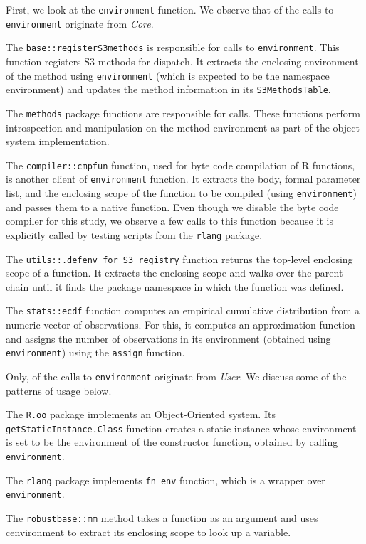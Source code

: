 \documentclass[10pt,review,sigplan,authorversion=true]{acmart}
\renewcommand{\c}[1]{\lstinline |#1|\xspace}
\begin{document}
First, we look at the \c{environment} function. We observe that
\EnvironmentCoreCallPerc of the calls to \c{environment} originate from
\emph{Core}.

The \c{base::registerS3methods} is responsible for
\EnvironmentBaseRegisterMethodCallPerc calls to
\c{environment}. This function registers S3 methods for dispatch. It extracts
the enclosing environment of the method using \c{environment} (which is expected
to be the namespace environment) and updates the method information in its
\c{S3MethodsTable}.

The \c{methods} package functions are responsible for
\EnvironmentMethodsCallPerc calls. These functions perform introspection and
manipulation on the method environment as part of the object system
implementation.

The \c{compiler::cmpfun} function, used for byte code compilation of R
functions, is another client of \c{environment} function. It extracts the body,
formal parameter list, and the enclosing scope of the function to be compiled
(using \c{environment}) and passes them to a native function. Even though we
disable the byte code compiler for this study, we observe a few calls to this
function because it is explicitly called by testing scripts from the \c{rlang}
package.

The \c{utils::.defenv_for_S3_registry} function returns the top-level enclosing
scope of a function. It extracts the enclosing scope and walks over the parent
chain until it finds the package namespace in which the function was defined.

The \c{stats::ecdf} function computes an empirical cumulative distribution from
a numeric vector of observations. For this, it computes an approximation
function and assigns the number of observations in its environment (obtained
using \c{environment}) using the \c{assign} function.

Only, \EnvironmentUserCallPerc of the calls to \c{environment} originate from
\emph{User}. We discuss some of the patterns of usage below.

The \c{R.oo} package implements an Object-Oriented system. Its
\c{getStaticInstance.Class} function creates a static instance whose environment
is set to be the environment of the constructor function, obtained by calling
\c{environment}.

The \c{rlang} package implements \c{fn_env} function, which is a wrapper over
\c{environment}.

The \c{robustbase::mm} method takes a function as an argument and uses
c{environment} to extract its enclosing scope to look up a variable.
\end{document}
